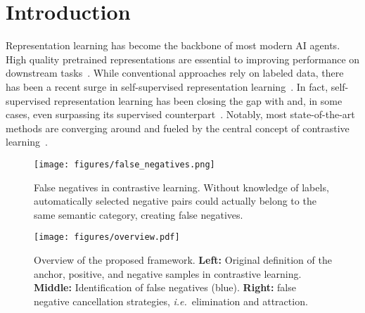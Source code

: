 \documentclass[10pt,twocolumn,letterpaper]{article}
\begin{document}
\section{Introduction}
Representation learning has become the backbone of most modern AI agents. High quality pretrained representations are essential to improving performance on downstream tasks~\cite{pmlr-v32-donahue14, 6909475, 10.1007/978-3-319-10590-1_53,kim17}. While conventional approaches rely on labeled data, there has been a recent surge in self-supervised representation learning~\cite{gidaris2018unsupervised, doersch2016unsupervised, noroozi2017unsupervised, pascal2018extracting, pathak2016context, chen2020generative, 8099559, 8099579}. In fact, self-supervised representation learning has been closing the gap with and, in some cases, even surpassing its supervised counterpart~\cite{chen2020simple, he2019moco, chen2020mocov2, chen2020big}. Notably, most state-of-the-art methods are converging around and fueled by the central concept of contrastive learning~\cite{oord2019representation, henaff2020dataefficient, hjelm2018learning, tian2020contrastive, misra2019selfsupervised, he2019moco, chen2020simple}.

\begin{figure}[t!]
    \centering
    \texttt{[image: figures/false\_negatives.png]}
    \caption{False negatives in contrastive learning. Without knowledge of labels, automatically selected negative pairs could actually belong to the same semantic category, creating false negatives.}
    \label{fig:false_negatives}
    \vspace{-10pt}
\end{figure}


\begin{figure*}[t!]
    \centering
    \texttt{[image: figures/overview.pdf]}
    \caption{Overview of the proposed framework. \textbf{Left:} Original definition of the anchor, positive, and negative samples in contrastive learning. \textbf{Middle:} Identification of false negatives (blue). \textbf{Right:} false negative cancellation strategies, \emph{i.e.}~elimination and attraction.}
    \label{fig:overview}
    \vspace{-5pt}
\end{figure*}
\end{document}
